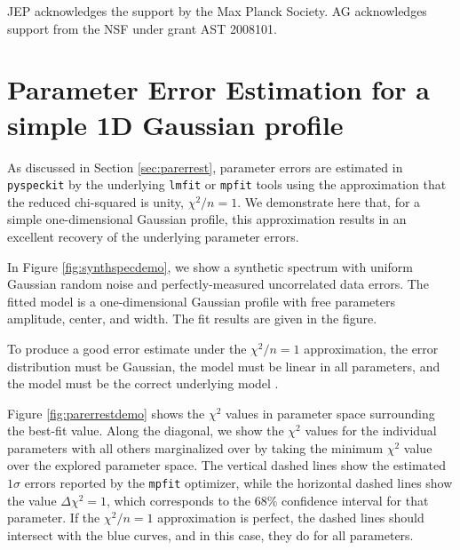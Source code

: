 \documentclass[twocolumn]{aastex63}
\newcommand{\pyspeckit}{\texttt{pyspeckit}\xspace}
\begin{document}
\acknowledgments
%
JEP acknowledges the support by the Max Planck Society. 
AG acknowledges support from the NSF under grant AST 2008101.





\appendix
\section{Parameter Error Estimation for a simple 1D Gaussian profile}
\label{appendix:parerrest}
As discussed in Section \ref{sec:parerrest}, parameter errors are estimated in
\pyspeckit by the underlying \texttt{lmfit} or \texttt{mpfit} tools using the
approximation that the reduced chi-squared is unity, $\chi^2/n=1$.  We
demonstrate here that, for a simple one-dimensional Gaussian profile, this
approximation results in an excellent recovery of the
underlying parameter errors.

In Figure \ref{fig:synthspecdemo}, we show a synthetic spectrum with uniform
Gaussian random noise and perfectly-measured uncorrelated data errors.
The fitted model is a one-dimensional Gaussian profile with free parameters
amplitude, center, and width.  The fit results are given in the figure.

To produce a good error estimate under the $\chi^2/n=1$ approximation, the error
distribution must be Gaussian, the model must be
linear in all parameters, and the model must be the correct underlying model
\citep{Andrae2010b}.

Figure \ref{fig:parerrestdemo} shows the $\chi^2$ values in parameter space
surrounding the best-fit value.  Along the diagonal, we show the $\chi^2$
values for the individual parameters with all others marginalized over
by taking the minimum $\chi^2$ value over the explored parameter space.  The vertical
dashed lines show the estimated $1\sigma$ errors reported by the \texttt{mpfit}
optimizer, while the
horizontal dashed lines show the value $\Delta\chi^2=1$, which corresponds to
the 68\% confidence interval for that parameter.  If the $\chi^2/n=1$
approximation is perfect, the dashed lines should intersect with the blue curves, and in this case, they do for all parameters.  
\end{document}
